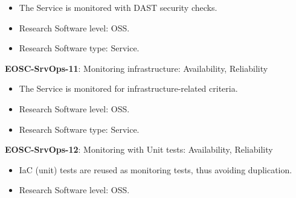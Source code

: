 \begin{itemize}
    \item The Service is monitored with DAST security checks. \cite{orviz_fernandez_eosc-synergy_2020}
    \item Research Software level: OSS.
    \item Research Software type: Service.
\end{itemize}

\textbf{EOSC-SrvOps-11}: Monitoring infrastructure: Availability, Reliability

\begin{itemize}
    \item The Service is monitored for infrastructure-related criteria. \cite{orviz_fernandez_eosc-synergy_2020}
    \item Research Software level: OSS.
    \item Research Software type: Service.
\end{itemize}

\textbf{EOSC-SrvOps-12}: Monitoring with Unit tests: Availability, Reliability

\begin{itemize}
    \item IaC (unit) tests are reused as monitoring tests, thus avoiding duplication. \cite{orviz_fernandez_eosc-synergy_2020}
    \item Research Software level: OSS.
\end{itemize}

